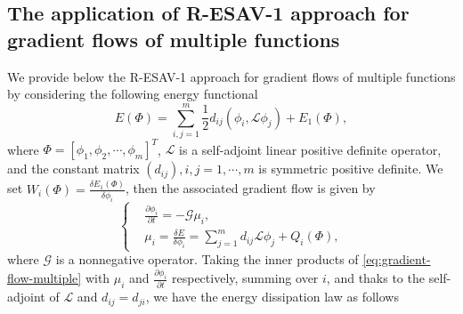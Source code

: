 \documentclass[final,review,onefignum,onetabnum]{siamart190516}
\theoremstyle{plain}
\begin{document}
 \subsection{The application of R-ESAV-1 approach for gradient flows of multiple functions}
 We provide below the R-ESAV-1 approach for gradient flows of multiple functions by considering the following energy functional
  \begin{equation}
E\left(\Phi\right)=\sum_{i,j=1}^{m}\frac{1}{2}d_{ij}(\phi_{i}, \mathcal{L} \phi_{j})+E_{1}\left(\Phi\right),
\end{equation}
where $\Phi=\left[\phi_{1}, \phi_{2}, \cdots, \phi_{m}\right]^{T}$, $\mathcal{L}$ is a self-adjoint linear positive definite operator, and the constant matrix $(d_{ij}), i, j=1, \cdots, m$ is symmetric positive definite. 
We set $W_{i}\left(\Phi\right)=\frac{\delta E_{1}\left(\Phi\right)}{\delta \phi_{i}}$, then the associated gradient flow is given by 
\begin{equation} \label{eq:gradient-flow-multiple}
	\left\{\begin{aligned}
		& \frac{\partial \phi_{i}}{\partial t}=-\mathcal{G} \mu_{i}, \\
		& \mu_{i}=\frac{\delta E}{\delta \phi_{i}}=\sum_{j=1}^{m}d_{ij} \mathcal{L} \phi_{j}+Q_{i}\left(\Phi\right),
\end{aligned}\right.
\end{equation}
where $\mathcal{G}$ is a nonnegative operator.
Taking the inner products of \eqref{eq:gradient-flow-multiple} with $\mu_{i}$ and $\frac{\partial \phi_{i}}{\partial t}$ respectively, summing over $i$, and thaks to the self-adjoint of $\mathcal{L}$ and $d_{ij}=d_{ji}$, we have the energy dissipation law as follows
\end{document}
